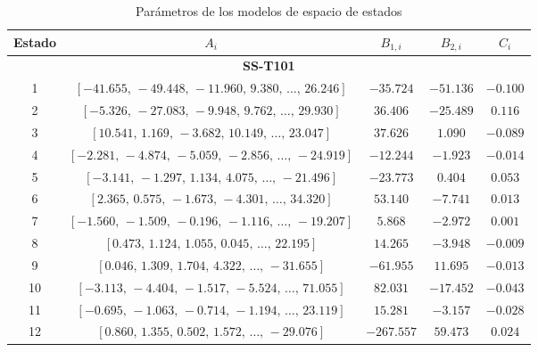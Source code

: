 \begin{table}[H]
\centering
\caption{Parámetros de los modelos de espacio de estados}
\label{tab:SS_T101}
\scriptsize
\begin{tabular}{c c c c c}
\toprule
Estado & $A_i$ & $B_{1,i}$ & $B_{2,i}$ & $C_i$ \\

\midrule
\multicolumn{5}{c}{\textbf{SS-T101}} \\
\midrule


1 &
$[-41.655,\,-49.448,\,-11.960,\,9.380,\,\dots,\,26.246]$
& $-35.724$
& $-51.136$
& $-0.100$
\\

2 &
$[-5.326,\,-27.083,\,-9.948,\,9.762,\,\dots,\,29.930]$
& $36.406$
& $-25.489$
& $0.116$
\\

3 &
$[10.541,\,1.169,\,-3.682,\,10.149,\,\dots,\,23.047]$
& $37.626$
& $1.090$
& $-0.089$
\\

4 &
$[-2.281,\,-4.874,\,-5.059,\,-2.856,\,\dots,\,-24.919]$
& $-12.244$
& $-1.923$
& $-0.014$
\\

5 &
$[-3.141,\,-1.297,\,1.134,\,4.075,\,\dots,\,-21.496]$
& $-23.773$
& $0.404$
& $0.053$
\\

6 &
$[2.365,\,0.575,\,-1.673,\,-4.301,\,\dots,\,34.320]$
& $53.140$
& $-7.741$
& $0.013$
\\

7 &
$[-1.560,\,-1.509,\,-0.196,\,-1.116,\,\dots,\,-19.207]$
& $5.868$
& $-2.972$
& $0.001$
\\

8 &
$[0.473,\,1.124,\,1.055,\,0.045,\,\dots,\,22.195]$
& $14.265$
& $-3.948$
& $-0.009$
\\

9 &
$[0.046,\,1.309,\,1.704,\,4.322,\,\dots,\,-31.655]$
& $-61.955$
& $11.695$
& $-0.013$
\\

10 &
$[-3.113,\,-4.404,\,-1.517,\,-5.524,\,\dots,\,71.055]$
& $82.031$
& $-17.452$
& $-0.043$
\\

11 &
$[-0.695,\,-1.063,\,-0.714,\,-1.194,\,\dots,\,23.119]$
& $15.281$
& $-3.157$
& $-0.028$
\\

12 &
$[0.860,\,1.355,\,0.502,\,1.572,\,\dots,\,-29.076]$
& $-267.557$
& $59.473$
& $0.024$
\\


\end{tabular}
\end{table}
